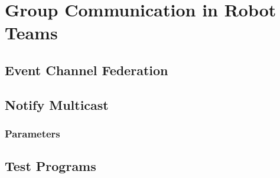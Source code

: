 \chapter{Group Communication in Robot Teams}
\label{sec:groupCommunication}

\section{Event Channel Federation}

\section{Notify Multicast}

\subsection{Parameters}

\section{Test Programs}


